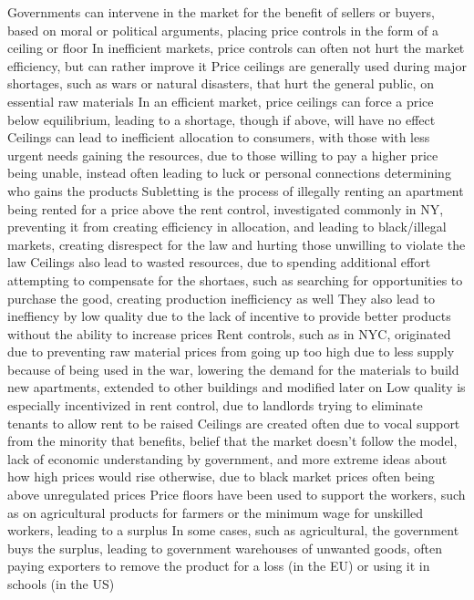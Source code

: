 \documentclass[11 pt, twoside]{article}
\newenvironment{outline*}
{
	\begin{outline}[enumerate]
	}
	{\end{outline}
}
\begin{document}
\begin{outline*}
\1 Governments can intervene in the market for the benefit of sellers or buyers, based on moral or political arguments, placing price controls in the form of a ceiling or floor
\2 In inefficient markets, price controls can often not hurt the market efficiency, but can rather improve it
\1 Price ceilings are generally used during major shortages, such as wars or natural disasters, that hurt the general public, on essential raw materials
\2 In an efficient market, price ceilings can force a price below equilibrium, leading to a shortage, though if above, will have no effect
\2 Ceilings can lead to inefficient allocation to consumers, with those with less urgent needs gaining the resources, due to those willing to pay a higher price being unable, instead often leading to luck or personal connections determining who gains the products
\2 Subletting is the process of illegally renting an apartment being rented for a price above the rent control, investigated commonly in NY, preventing it from creating efficiency in allocation, and leading to black/illegal markets, creating disrespect for the law and hurting those unwilling to violate the law
\2 Ceilings also lead to wasted resources, due to spending additional effort attempting to compensate for the shortaes, such as searching for opportunities to purchase the good, creating production inefficiency as well
\2 They also lead to ineffiency by low quality due to the lack of incentive to provide better products without the ability to increase prices
\1 Rent controls, such as in NYC, originated due to preventing raw material prices from going up too high due to less supply because of being used in the war, lowering the demand for the materials to build new apartments, extended to other buildings and modified later on
\2 Low quality is especially incentivized in rent control, due to landlords trying to eliminate tenants to allow rent to be raised
\1 Ceilings are created often due to vocal support from the minority that benefits, belief that the market doesn't follow the model, lack of economic understanding by government, and more extreme ideas about how high prices would rise otherwise, due to black market prices often being above unregulated prices
\1 Price floors have been used to support the workers, such as on agricultural products for farmers or the minimum wage for unskilled workers, leading to a surplus
\2 In some cases, such as agricultural, the government buys the surplus, leading to government warehouses of unwanted goods, often paying exporters to remove the product for a loss (in the EU) or using it in schools (in the US)

\end{outline*}
\end{document}
